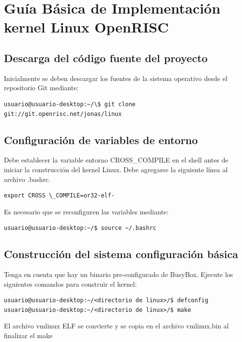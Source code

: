 \chapter{Guía Básica de Implementación kernel Linux OpenRISC} \label{app:apendice5}

\section{Descarga del código fuente del proyecto}

Inicialmente se deben descargar los fuentes de la sistema operativo desde el repositorio Git mediante:

\begin{lstlisting}[breaklines]
 usuario@usuario-desktop:~/\$ git clone git://git.openrisc.net/jonas/linux
\end{lstlisting}


\section{Configuración de variables de entorno}

Debe establecer la variable entorno CROSS\_COMPILE en el shell antes de iniciar la construcción del kernel Linux. Debe agregarse la siguiente línea al archivo .bashrc.

\begin{lstlisting}[breaklines]
export CROSS \_COMPILE=or32-elf-
\end{lstlisting}

Es necesario que se reconfiguren las variables mediante:
\begin{lstlisting}[breaklines]
 usuario@usuario-desktop:~/$ source ~/.bashrc
\end{lstlisting}

\section{Construcción del sistema configuración básica}

Tenga en cuenta que hay un binario pre-configurado de BusyBox. Ejecute los siguientes comandos para construir el kernel:


\begin{lstlisting}[breaklines]
usuario@usuario-desktop:~/<directorio de linux>/$ defconfig
usuario@usuario-desktop:~/<directorio de linux>/$ make
\end{lstlisting}

El archivo vmlinux ELF se convierte y se copia en el archivo vmlinux.bin al finalizar el make

